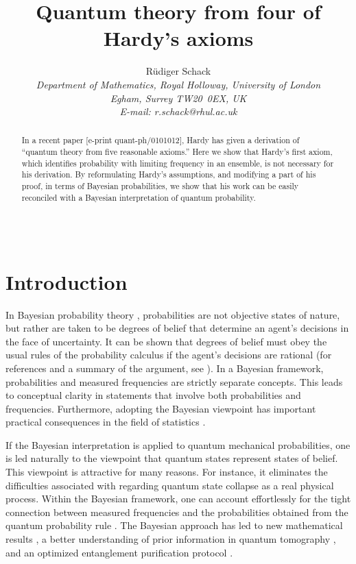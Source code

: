 \documentclass[pra,12pt,tightenlines]{revtex4-2}
\begin{document}
\title{Quantum theory from four of Hardy's axioms}

\author{R\"udiger Schack \\
\it Department of Mathematics, Royal Holloway, University of London \\ 
Egham, Surrey TW20~0EX, UK \\ 
E-mail: r.schack@rhul.ac.uk \\
$\;$ \\ $\;$}

\begin{abstract}
  In a recent paper [e-print quant-ph/0101012], Hardy has given a derivation
  of ``quantum theory from five reasonable axioms.'' Here we show that Hardy's
  first axiom, which identifies probability with limiting frequency in an
  ensemble, is not necessary for his derivation.  By reformulating Hardy's
  assumptions, and modifying a part of his proof, in terms of Bayesian
  probabilities, we show that his work can be easily reconciled with a Bayesian
  interpretation of quantum probability.
\end{abstract}

\pacs{}

\maketitle

$\;$ \section{Introduction}

In Bayesian probability theory \cite{Bernardo1994,Kyburg1980}, probabilities
are not objective states of nature, but rather are taken to be degrees of
belief that determine an agent's decisions in the face of uncertainty.
It can be shown that degrees of belief must obey the usual rules of the
probability calculus if the agent's decisions are rational (for
references and a summary of the argument, see \cite{Caves2002a}). In a Bayesian
framework, probabilities and measured frequencies are strictly separate
concepts. This leads to conceptual clarity in statements that involve both
probabilities and frequencies. Furthermore, adopting the Bayesian viewpoint
has important practical consequences in the field of statistics
\cite{Bernardo1994,Malakoff1999}.

If the Bayesian interpretation is applied to quantum mechanical probabilities,
one is led naturally to the viewpoint that quantum states represent states of
belief. This viewpoint is attractive for many reasons. For instance, it
eliminates the difficulties associated with regarding quantum state collapse
as a real physical process. Within the Bayesian framework, one can account
effortlessly for the tight connection between measured frequencies and the
probabilities obtained from the quantum probability rule \cite{Caves2002c}.
The Bayesian approach has led to new mathematical results
\cite{Caves2002b,Caves2002a}, a better understanding of prior information in
quantum tomography \cite{Schack2001a}, and an optimized entanglement
purification protocol \cite{Brun2001a}.
\end{document}
